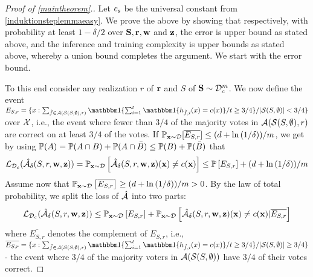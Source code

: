 \begin{proof}[Proof of \cref{maintheorem}.]
Let $c_s$ be the universal constant from \cref{induktionsteplemmaeasy}. We prove the above by showing that respectively, with probability at least $1-\delta/2$ over $\mathbf{S},\mathbf{r},\mathbf{w}$ and $\mathbf{z}$, the error is upper bound as stated above, and the inference and training complexity is upper bounds as stated above,  whereby a union bound completes the argument. We start with the error bound.

To this end consider any realization $r$ of $\mathbf{r}$ and $S$ of $\mathbf{S}\sim \mathcal{D}_{c}^{m}$. We now define the event  $E_{S,r}=\{x:     
  \sum_{\tilde{f}\in \cA(\cS(S,\emptyset),r)} \ind\{\sum_{i=1}^{t} \ind\{h_{\tilde{f},i}(x)=c(x)\}/t\geq 3/4\}/|\cS(S,\emptyset)|
   <3/4 \}$  over $\mathcal{X}$, i.e., the event where fewer than $3/4$ of the majority votes in $\mathcal{A}(\mathcal{S}(S,\emptyset),r)$ are correct on at least  $3/4$ of the votes. If $\mathbb{P}_{\mathbf{x}\sim \mathcal{D}}[\overline{E_{S,r}}] \leq (d+\ln{\left(1/\delta \right)})/m$, we get by using $\mathbb{P}(A)=\mathbb{P}(A\cap B)+\mathbb{P}(A\cap \bar{B})\leq\mathbb{P}(B)+\mathbb{P}(\bar{B})$ that
  \begin{align}\label{eq:maincorrectness1}
      \operatorname{\mathcal{L}}_{\mathcal{D}_{c}}(\mathcal{\hat{A}}_{\delta}(S,r,\mathbf{w},\mathbf{z})) =\mathbb{P}_{\mathbf{x}\sim \mathcal{D}}\left[\mathcal{\hat{A}}_{\delta}(S,r,\mathbf{w},\mathbf{z})(\mathbf{x})\not=c(\mathbf{x})\right]
      \leq \mathbb{P}\left[E_{S,r}\right]+(d+\ln{(1/\delta)})/m
  \end{align}
Assume now that $ \mathbb{P}_{\mathbf{x}\sim \mathcal{D}}\left[\overline{E_{S,r}}\right] \geq (d+\ln{\left(1/\delta \right)})/m >0 $. By the law of total probability, we split the loss of $\mathcal{\hat{A}}$ into two parts:
   \begin{align}\label{eq:maincorrectness2}
    \operatorname{\mathcal{L}}_{\mathcal{D}_{c}}(\mathcal{\hat{A}}_{\delta}(S,r,\mathbf{w},\mathbf{z})) 
    \leq \mathbb{P}_{\mathbf{x}\sim \mathcal{D}}\left[E_{S,r}\right]+\mathbb{P}_{\mathbf{x}\sim \mathcal{D}}\left[\mathcal{\hat{A}}_{\delta}(S,r,\mathbf{w},\mathbf{z})(\mathbf{x})\not=c(\mathbf{x})|\overline{E_{S,r}}\right]
   \end{align}
where $ \overline{E_{S,r}} $ denotes the complement of $E_{S,r}$, i.e., $\overline{E_{S,r}}=\{x:     
  \sum_{\tilde{f}\in \cA(\cS(S,\emptyset),r)} \ind\{\sum_{i=1}^{t} \ind\{h_{\tilde{f},i}(x)=c(x)\}/t\geq 3/4\}/|\cS(S,\emptyset)|
   \geq3/4 \}$ - the event where $3/4$ of the majority voters in $\mathcal{A}(\mathcal{S}(S,\emptyset))$ have $3/4$ of their votes correct. 


\end{proof}
